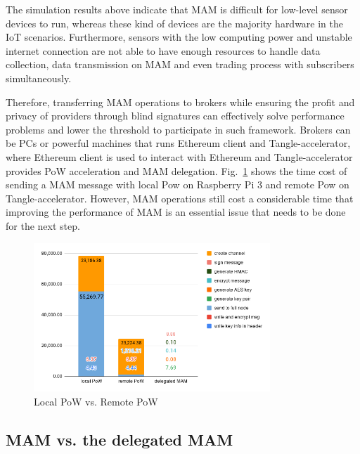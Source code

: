\documentclass[conference]{IEEEtran}
\begin{document}
The simulation results above indicate that MAM is difficult for low-level sensor devices to run, whereas these kind of devices are the majority hardware in the IoT scenarios. Furthermore, sensors with the low computing power and unstable internet connection are not able to have enough resources to handle data collection, data transmission on MAM and even trading process with subscribers simultaneously. 

Therefore, transferring MAM operations to brokers while ensuring the profit and privacy of providers through blind signatures can effectively solve performance problems and lower the threshold to participate in such framework. Brokers can be PCs or powerful machines that runs Ethereum client and Tangle-accelerator, where Ethereum client is used to interact with Ethereum and Tangle-accelerator provides PoW acceleration and MAM delegation. Fig.~\ref{fig:rpi3_pow} shows the time cost of sending a MAM message with local Pow on Raspberry Pi 3 and remote Pow on Tangle-accelerator. However, MAM operations still cost a considerable time that improving the performance of MAM is an essential issue that needs to be done for the next step.

\begin{figure}[!t]
    \centering
    \includegraphics[width=3.5in]{rpi3_pow}
    \caption{Local PoW vs. Remote PoW}
    \label{fig:rpi3_pow}
\end{figure}

\subsection{MAM vs. the delegated MAM}
\label{section:smart_contract_evaluation}
\end{document}
